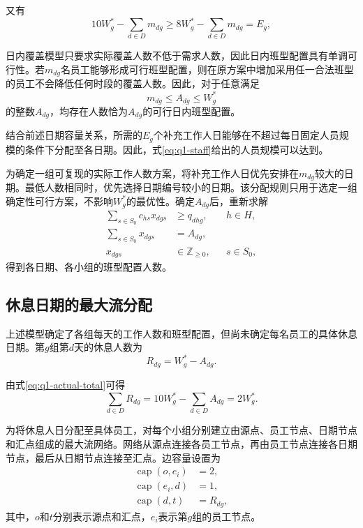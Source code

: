 \documentclass[withoutpreface,bwprint]{cumcmthesis}
\begin{document}
又有
\[
10W_g^*-\sum_{d\in D}m_{dg}
\geq
8W_g^*-\sum_{d\in D}m_{dg}=E_g,
\]

日内覆盖模型只要求实际覆盖人数不低于需求人数，因此日内班型配置具有单调可行性。若$m_{dg}$名员工能够形成可行班型配置，则在原方案中增加采用任一合法班型的员工不会降低任何时段的覆盖人数。因此，对于任意满足
\[
m_{dg}\leq A_{dg}\leq W_g^*
\]
的整数$A_{dg}$，均存在人数恰为$A_{dg}$的可行日内班型配置。

结合前述日期容量关系，所需的$E_g$个补充工作人日能够在不超过每日固定人员规模的条件下分配至各日期。因此，式\eqref{eq:q1-staff}给出的人员规模可以达到。

为确定一组可复现的实际工作人数方案，将补充工作人日优先安排在$m_{dg}$较大的日期。最低人数相同时，优先选择日期编号较小的日期。该分配规则只用于选定一组确定性可行方案，不影响$W_g^*$的最优性。确定$A_{dg}$后，重新求解
\begin{align}
\sum_{s\in S_0}c_{hs}x_{dgs}
&\geq q_{dhg},
&&h\in H,\label{eq:q1-final-cover}\\
\sum_{s\in S_0}x_{dgs}
&=A_{dg},\label{eq:q1-final-count}\\
x_{dgs}&\in\mathbb{Z}_{\geq0},
&&s\in S_0,
\end{align}
得到各日期、各小组的班型配置人数。

\subsection{休息日期的最大流分配}

上述模型确定了各组每天的工作人数和班型配置，但尚未确定每名员工的具体休息日期。第$g$组第$d$天的休息人数为
\begin{equation}
R_{dg}=W_g^*-A_{dg}.
\label{eq:q1-rest-number}
\end{equation}

由式\eqref{eq:q1-actual-total}可得
\begin{equation}
\sum_{d\in D}R_{dg}
=
10W_g^*-\sum_{d\in D}A_{dg}
=
2W_g^*.
\label{eq:q1-rest-total}
\end{equation}

为将休息人日分配至具体员工，对每个小组分别建立由源点、员工节点、日期节点和汇点组成的最大流网络。网络从源点连接各员工节点，再由员工节点连接各日期节点，最后从日期节点连接至汇点。边容量设置为
\begin{equation}
\begin{aligned}
\operatorname{cap}(o,e_i)&=2,\\
\operatorname{cap}(e_i,d)&=1,\\
\operatorname{cap}(d,t)&=R_{dg},
\end{aligned}
\label{eq:q1-flow-capacity}
\end{equation}
其中，$o$和$t$分别表示源点和汇点，$e_i$表示第$g$组的员工节点。
\end{document}
